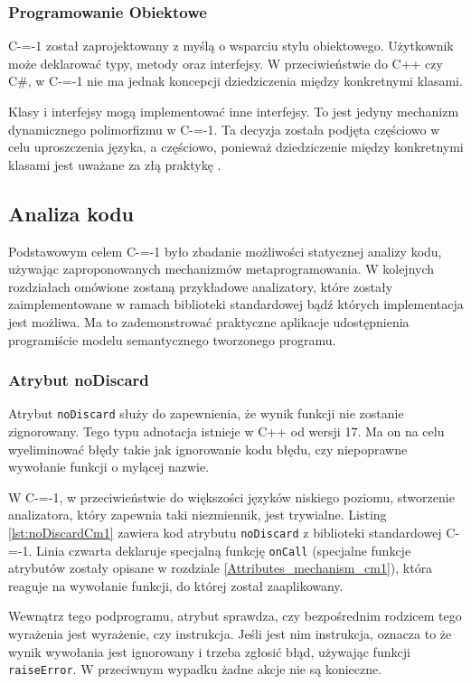 \subsubsection{Programowanie Obiektowe}
C-=-1 został zaprojektowany z myślą o wsparciu stylu obiektowego. Użytkownik może deklarować typy, metody oraz interfejsy. W przeciwieństwie do C++ czy C\#, w C-=-1 nie ma jednak koncepcji dziedziczenia między konkretnymi klasami.

Klasy i interfejsy mogą implementować inne interfejsy.
To jest jedyny mechanizm dynamicznego polimorfizmu w C-=-1.
Ta decyzja została podjęta częściowo w celu uproszczenia języka, a częściowo, ponieważ dziedziczenie między konkretnymi klasami jest uważane za złą praktykę \cite{gang_of_four:design_patterns}.

\subsection{Analiza kodu}
Podstawowym celem C-=-1 było zbadanie możliwości statycznej analizy kodu, używając zaproponowanych mechanizmów metaprogramowania.
W kolejnych rozdziałach omówione zostaną przykładowe analizatory, które zostały zaimplementowane w ramach biblioteki standardowej bądź których implementacja jest możliwa.
Ma to zademonstrować praktyczne aplikacje udostępnienia programiście modelu semantycznego tworzonego programu.



\subsubsection{Atrybut noDiscard}
\label{no_discard}

Atrybut \lstinline{noDiscard} służy do zapewnienia, że wynik funkcji nie zostanie zignorowany.
Tego typu adnotacja istnieje w C++ od wersji 17\cite{ISO:cpp17}.
Ma on na celu wyeliminować błędy takie jak ignorowanie kodu błędu, czy niepoprawne wywołanie funkcji o mylącej nazwie.

W C-=-1, w przeciwieństwie do większości języków niskiego poziomu, stworzenie analizatora, który zapewnia taki niezmiennik, jest trywialne.
Listing \ref{lst:noDiscardCm1} zawiera kod atrybutu \lstinline{noDiscard} z biblioteki standardowej C-=-1.
Linia czwarta deklaruje specjalną funkcję \lstinline{onCall} (specjalne funkcje atrybutów zostały opisane w rozdziale \ref{Attributes_mechanism_cm1}), która reaguje na wywołanie funkcji, do której został zaaplikowany.

Wewnątrz tego podprogramu, atrybut sprawdza, czy bezpośrednim rodzicem tego wyrażenia jest wyrażenie, czy instrukcja.
Jeśli jest nim instrukcja, oznacza to że wynik wywołania jest ignorowany i trzeba zgłosić błąd, używając funkcji \lstinline{raiseError}.
W przeciwnym wypadku żadne akcje nie są konieczne.

